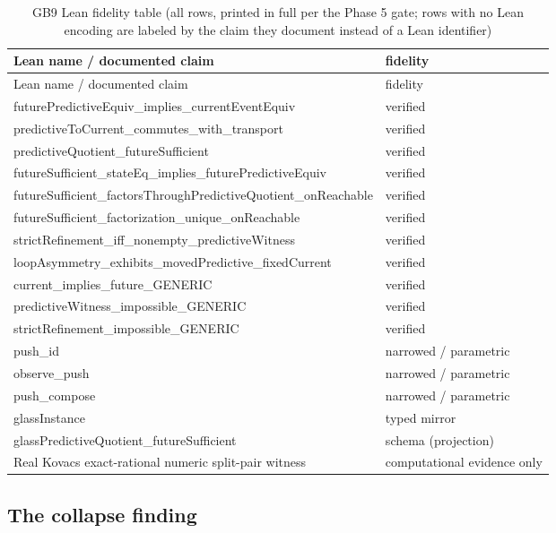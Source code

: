 \documentclass[11pt]{article}
\theoremstyle{definition}
\begin{document}
\begin{longtable}{lp{6cm}}
\caption{GB9 Lean fidelity table (all rows, printed in full per the Phase 5 gate; rows with no Lean encoding are labeled by the claim they document instead of a Lean identifier)}\label{tab:lean-fidelity-full} \\
\toprule
Lean name / documented claim & fidelity \\
\midrule
\endfirsthead
\toprule
Lean name / documented claim & fidelity \\
\midrule
\endhead
\bottomrule
\endfoot
futurePredictiveEquiv\_implies\_currentEventEquiv & verified \\
predictiveToCurrent\_commutes\_with\_transport & verified \\
predictiveQuotient\_futureSufficient & verified \\
futureSufficient\_stateEq\_implies\_futurePredictiveEquiv & verified \\
futureSufficient\_factorsThroughPredictiveQuotient\_onReachable & verified \\
futureSufficient\_factorization\_unique\_onReachable & verified \\
strictRefinement\_iff\_nonempty\_predictiveWitness & verified \\
loopAsymmetry\_exhibits\_movedPredictive\_fixedCurrent & verified \\
current\_implies\_future\_GENERIC & verified \\
predictiveWitness\_impossible\_GENERIC & verified \\
strictRefinement\_impossible\_GENERIC & verified \\
push\_id & narrowed / parametric \\
observe\_push & narrowed / parametric \\
push\_compose & narrowed / parametric \\
glassInstance & typed mirror \\
glassPredictiveQuotient\_futureSufficient & schema (projection) \\
Real Kovacs exact-rational numeric split-pair witness & computational evidence only \\
\bottomrule
\end{longtable}
 
\subsection{The collapse finding}
\end{document}

